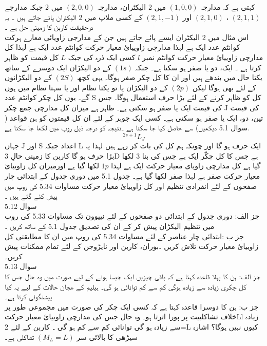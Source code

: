 کہتی ہے کہ مدارجہ
\((1,0,0)\)
 میں 2 الیکٹران، 
مدارجہ
\(( 2,0,0)\) 
میں 2 جبکہ مدارجے
\(( 2,1,1)\)
، 
\((2,1,0)\) 
اور
 \((2,1,-1)\) 
کے کسی ملاپ میں 2 الیکٹران پائے جاتے ہیں ۔ یہ درحقیقت کاربن کا زمینی حل ہے ۔ \\
اس مثال میں 2 الیکٹران ایسے پائے جاتے ہیں جن کے مدارجی زاویائی معارے ہرکت کوانٹم  عدد ایک ہے لہذا مدارچی زاوییائ معیار حرکت کوانٹم عدد ایک ہے لہذا کل مدارچی زاوییائ معیار حرکت کوانٹم نمبر 
\(l\)
کسی ایک ذرہ کی جبک
\(L\)
کل قیمت کو ظاہر کرتا ہے ۔ ایک، دو یا صفر ہو  سکتا ہے۔ جبکہ
 \((1s)\) 
کے دو الیکڑان ایک دوسرے کے ساتھ یکتا حال میں بندھے ہیں اور ان کا کل چکر صفر ہوگا۔ یہی کچھ
\(( 2S)\)
 کے دو الیکڑانوں کے لئے بھی ہوگا لیکن
 \((2p)\)
 کے دو الیکڑان یا تو یکتا نظام اور یا سہتا نظام میں ہوں گے۔ یوں کل چکر کوانٹم عدد S کل کو ظاہر کرنے کے لئے بڑا حرف استعمال ہوگا۔ جس کی قیمت ایک یا صفر ہو سکتی ہے۔ ظاہر ہے میزان کل مدارچی جمع چکر J کی قیمت تین، دو، ایک یا صفر ہو سکتی ہے۔ کسی ایک جوہر کے لئے ان کل قیمتوں کو ہن قواعد ( سوال 5.1 دیکھیں)  سے حاصل کیا جا سکتا ہے ۔نتیجہ کو درجہ ذیل روپ میں لکھا جا سکتا ہے. 
 \[^{2s+1}L_{J}\]
  جہاں J اور S اعداد جبکہ L ایک حرف ہو گا اور چونکہ ہم کل کی بات کر رہے ہیں لہذا یہ بڑا حرف ہو گا کاربن کا زمینی حالِ 3D ہے جس کا کل چکّر ایک ہے جس کی بنا 3 لکھا گیا ہے کل مدارچی زاویای معیار حرکت ایک ہے لہذا
  \(1p\) 
  لکھا گیا ہے اورمیزان  کل زاوییائ معیار حرکت صفر ہے لہذا صفر لکھا گیا ہے۔ جدول  5.1 میں دوری جدول کے ابتدائی چار صفحوں کے لئے انفرادی  تنظیم اور کل زاوییائ معیار حرکت مساوات 5.34 کی روپ میں پیش کئے گئے ہیں ۔ \\
  سوال 5.12 \\
  جز الف: دوری جدول کے ابتدائی  دو صفحوں  کے لئے نییوون تک مساوات 5.33 کی روپ میں تنظیم الیکڑان پیش کر کے ان کی تصدیق جدول 5.1 کے ساتھ کریں ۔ \\
  جز ب :ابتدائی  چار عناصر  کے لئے مساوات  5.34 کی روپ میں ان کا مطابقتی کل زاوییائ معیار حرکت تلاش کریں ۔بوران، کاربن اور نایڑوجن کے لئے تمام ممکنات پیش کریں۔\\
   سوال 5.13\\ 
   جز الف: ہن کا پہلا قاعدہ کہتا ہے کہ باقی چیزیں ایک جیسا ہونے کے لیے صورت میں وہ حال جس کا کل چکری زیادہ سے زیادہ ہوگی کم سے کم توانائی ہو گی۔ ہیلیم کے ھجان حالات کے لیے یہ کیا پیشنگوئی کرتا ہے۔\\
    جز ب: ہن کا دوسرا قاعدہ کہتا ہے کہ کسی ایک چکر کی صورت میں مجموعی طور پر خلاف تشاکلییت پر پورا اترتا ہو۔ وہ حال جس کی مدارچی زاوییائ معیار حرکتLl زیادہ سے زیادہ ہو گی توانائی کم سے کم ہو گی ۔ کاربن کے لئے 2=L کیوں نہیں ہوگا؟ اشارہ سیڑھی کا بالائی سر
    \((M_{L}=L)\)
      تشاکلی ہے۔\\
